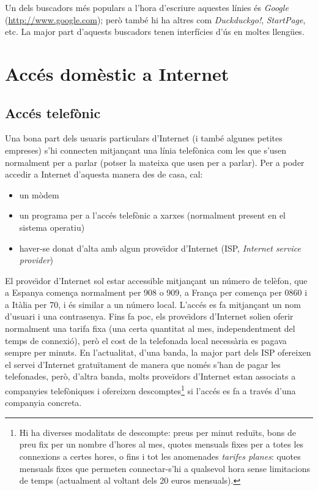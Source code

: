 Un dels buscadors més populars a l'hora d'escriure aquestes línies és
\emph{Google} (\url{http://www.google.com}); però també hi ha altres
com \emph{Duckduckgo!}, \emph{StartPage}, etc. La major part d'aquests
buscadors tenen interfícies d'ús en moltes llengües.


\section{Accés domèstic a Internet}
\label{ss:adaI}

\subsection{Accés telefònic}


Una bona part dels usuaris particulars d'Internet (i també algunes
petites empreses) s'hi connecten mitjançant una línia telefònica
com les que s'usen normalment per a parlar (potser la mateixa que usen
per a parlar). Per a poder accedir a Internet d'aquesta manera des de
casa, cal:
\begin{itemize} \item un mòdem \item un programa per a l'accés
  telefònic a xarxes (normalment present en el sistema operatiu) \item
  haver-se donat d'alta amb algun prove\"{\i}dor d'Internet (ISP,
  \emph{Internet service provider})
\end{itemize} El prove\"{\i}dor d'Internet sol estar accessible
mitjançant un número de telèfon, que a Espanya comença normalment
per 908 o 909, a França per comença per 0860 i a Itàlia per 70, i és
similar a un número local. L'accés es fa mitjançant un nom d'usuari i
una contrasenya. Fins fa poc, els prove\"{\i}dors d'Internet solien
oferir normalment una tarifa fixa (una certa quantitat al mes,
independentment del temps de connexió), però el cost de la telefonada
local necessària es pagava sempre per minuts. En l'actualitat, d'una
banda, la major part dels ISP ofereixen el servei d'Internet
gratuïtament de manera que només s'han de pagar les telefonades, però,
d'altra banda, molts proveïdors d'Internet estan associats a
companyies telefòniques i ofereixen descomptes\footnote{Hi ha diverses
  modalitats de descompte: preus per minut reduïts, bons de preu fix
  per un nombre d'hores al mes, quotes mensuals fixes per a totes les
  connexions a certes hores, o fins i tot les anomenades \emph{tarifes
    planes}: quotes mensuals fixes que permeten connectar-s'hi a
  qualsevol hora sense limitacions de temps (actualment al voltant
  dels 20 euros mensuals).} si l'accés es fa a través d'una companyia
concreta.

